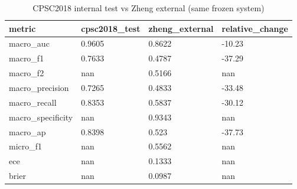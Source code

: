 \begin{table}[htbp]\centering\small
\caption{CPSC2018 internal test vs Zheng external (same frozen system)}\label{tab:cpscext}
\begin{tabular}{llll}
\hline
metric & cpsc2018_test & zheng_external & relative_change \\
\hline
macro_auc & 0.9605 & 0.8622 & -10.23 \\
macro_f1 & 0.7633 & 0.4787 & -37.29 \\
macro_f2 & nan & 0.5166 & nan \\
macro_precision & 0.7265 & 0.4833 & -33.48 \\
macro_recall & 0.8353 & 0.5837 & -30.12 \\
macro_specificity & nan & 0.9343 & nan \\
macro_ap & 0.8398 & 0.523 & -37.73 \\
micro_f1 & nan & 0.5562 & nan \\
ece & nan & 0.1333 & nan \\
brier & nan & 0.0987 & nan \\
\hline
\end{tabular}
\end{table}
